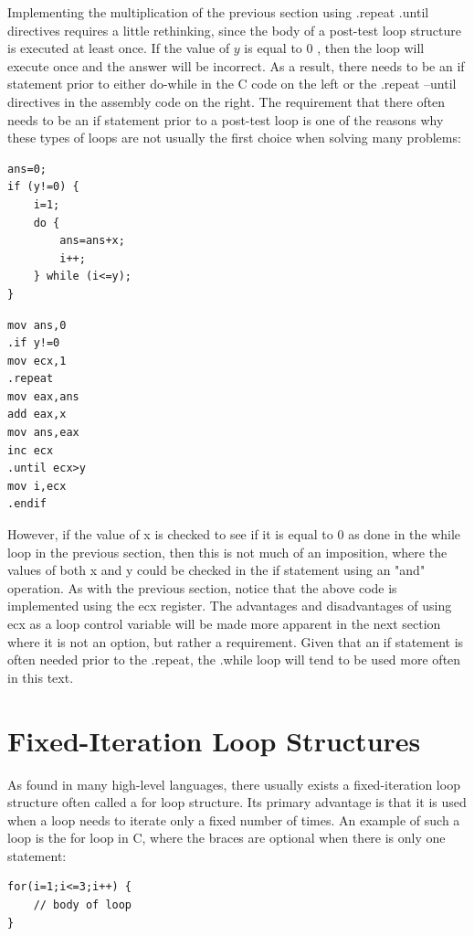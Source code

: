 \documentclass[10pt]{book}
\begin{document}
Implementing the multiplication of the previous section using .repeat .until directives requires a little rethinking, since the body of a post-test loop structure is executed at least once. If the value of $y$ is equal to 0 , then the loop will execute once and the answer will be incorrect. As a result, there needs to be an if statement prior to either do-while in the C code on the left or the .repeat --until directives in the assembly code on the right. The requirement that there often needs to be an if statement prior to a post-test loop is one of the reasons why these types of loops are not usually the first choice when solving many problems:

\begin{verbatim}
ans=0;
if (y!=0) {
    i=1;
    do {
        ans=ans+x;
        i++;
    } while (i<=y);
}
\end{verbatim}

\begin{verbatim}
mov ans,0
.if y!=0
mov ecx,1
.repeat
mov eax,ans
add eax,x
mov ans,eax
inc ecx
.until ecx>y
mov i,ecx
.endif
\end{verbatim}

However, if the value of x is checked to see if it is equal to 0 as done in the while loop in the previous section, then this is not much of an imposition, where the values of both x and y could be checked in the if statement using an "and" operation. As with the previous section, notice that the above code is implemented using the ecx register. The advantages and disadvantages of using ecx as a loop control variable will be made more apparent in the next section where it is not an option, but rather a requirement. Given that an if statement is often needed prior to the .repeat, the .while loop will tend to be used more often in this text.

\section{Fixed-Iteration Loop Structures}
As found in many high-level languages, there usually exists a fixed-iteration loop structure often called a for loop structure. Its primary advantage is that it is used when a loop needs to iterate only a fixed number of times. An example of such a loop is the for loop in C, where the braces are optional when there is only one statement:

\begin{verbatim}
for(i=1;i<=3;i++) {
    // body of loop
}
\end{verbatim}
\end{document}
